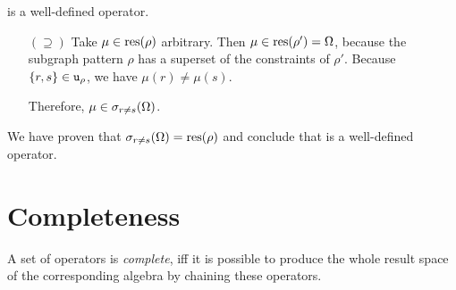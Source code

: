 \begin{definition}
\begin{proofof}{ is a well-defined operator.}
\begin{itemize}
\begin{enumerate}[(1)]
      \item %
        Fulfilled, because $\lambda_\rho = \lambda_{\rho'}$ and
        $\mu \in \result(\rho')$.
        
      \item %
        Fulfilled, because $\nlabel_\rho = \nlabel_{\rho'}$ and
        $\mu \in \result(\rho')$.
      
      \item %
        Fulfilled, because $\rtype_\rho = \rtype_{\rho'}$ and
        $\mu \in \result(\rho')$.
        
      \item %
        By definition it holds that $\{r,s\} \in \rpairs_\rho$ and
        $\mu(r) \not = \mu(s)$.
        
        Take now $\{t,u\} \in \rpairs_\rho$ with $\{t,u\} \not = \{r,s\}$.
        Then $\{t,u\} \in \rpairs_{\rho'}$ and because $\mu \in \result(\rho')$
        it follows that $\mu(t) \not = \mu(u)$.
    \end{enumerate}
    
    As a result, $\mu \in \result(\rho)$.

  \item[$(\supseteq)$]
    Take $\mu \in \result(\rho)$ arbitrary.
    Then $\mu \in \text{res}(\rho') = \Omega$, because the subgraph pattern $\rho$
    has a superset of the constraints of $\rho'$.
    Because $\{r,s\} \in \rpairs_\rho$, we have $\mu(r) \not = \mu(s)$.
    
    Therefore, $\mu \in \sigma_{r \not = s}(\Omega)$.
\end{itemize}

We have proven that $\sigma_{r \not = s}(\Omega) = \text{res}(\rho)$ and conclude that
 is a well-defined operator.
\end{proofof}
\end{definition}

\section{Completeness}
\label{sec:completeness}

A set of operators is \emph{complete}, iff it is possible to produce the whole
result space of the corresponding algebra by chaining these operators.

